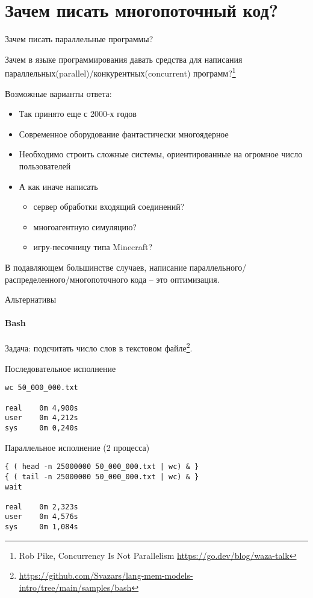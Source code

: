 

\section{Зачем писать многопоточный код?}
\showTOC


\begin{frame}{Зачем писать параллельные программы?}

Зачем в языке программирования давать средства для написания параллельных(parallel)/конкурентных(concurrent) программ?\footnote{\tiny Rob Pike, Concurrency Is Not Parallelism  \url{https://go.dev/blog/waza-talk}}

\pause

Возможные варианты ответа:
\begin{itemize}
 \pause
 \item Так принято еще с 2000-х годов

 \pause
 \item Современное оборудование фантастически многоядерное

 \pause
 \item Необходимо строить сложные системы, ориентированные на огромное число пользователей

 \pause
 \item А как иначе написать 
 \begin{itemize}
    \pause
    \item сервер обработки входящий соединений?
    
    \pause
    \item многоагентную симуляцию?

    \pause
    \item игру-песочницу типа Minecraft?
 \end{itemize}
\end{itemize}

\pause

В подавляющем большинстве случаев, написание параллельного/распределенного/многопоточного кода -- это оптимизация.

\end{frame}


\begin{frame}[fragile]{Альтернативы}
\framesubtitle{Bash}

Задача: подсчитать число слов в текстовом файле\footnote{\tiny\url{https://github.com/Svazars/lang-mem-models-intro/tree/main/samples/bash}}.

\pause
Последовательное исполнение
\begin{lstlisting}
wc 50_000_000.txt

real    0m 4,900s
user    0m 4,212s
sys     0m 0,240s
\end{lstlisting}

\pause 
Параллельное исполнение (2 процесса)
\begin{lstlisting}
{ ( head -n 25000000 50_000_000.txt | wc) & }
{ ( tail -n 25000000 50_000_000.txt | wc) & }
wait

real    0m 2,323s
user    0m 4,576s
sys     0m 1,084s
\end{lstlisting}

\end{frame}

